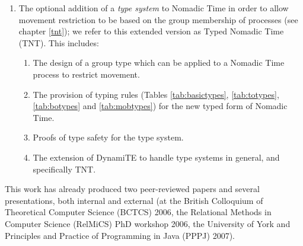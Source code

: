 \begin{enumerate}
{  framework}, DynamiTE, through the implementation of its constructs
  as programmatic elements in the Java programming language (see
  chapter \ref{dynamite}).  This allows the specification of system
  interactions to be shifted directly from the theoretical domain into
  an implementation backed by a formal methodology, with the intention
  of improving industrial adoption of concurrent techniques.  This includes:
\begin{enumerate}[\bfseries {C2.}1]
\item The creation of a translation schema (Table
  \ref{tab:translationschema1}), mapping process terms in Nomadic Time
  to Java objects.
\item The implementation of the operational semantics as methods in
  the appropriate Java objects defined in the schema.
\item The design and implementation of a plugin framework, allowing
  the use of different process calculi and different \emph{side
    effects} as the result of performing a transition.
\item The design and implementation of the \emph{evolver} framework,
  allowing the execution semantics to be both clearly denoted and
  interchangable.
\end{enumerate}
\item The optional addition of a \emph{type system} to Nomadic Time in
  order to allow movement restriction to be based on the group
  membership of processes (see chapter \ref{tnt}); we refer to this
  extended version as Typed Nomadic Time (TNT).  This includes:
\begin{enumerate}[\bfseries {C3.}1]
\item The design of a group type which can be applied to a Nomadic
  Time process to restrict movement.
\item The provision of typing rules (Tables \ref{tab:basictypes},
  \ref{tab:totypes}, \ref{tab:botypes} and \ref{tab:mobtypes}) for the
  new typed form of Nomadic Time.
\item Proofs of type safety for the type system.
\item The extension of DynamiTE to handle type systems in general, and
  specifically TNT.
\end{enumerate}
\end{enumerate}

This work has already produced two peer-reviewed papers
\cite{nt,dynamite} and several presentations, both internal and
external (at the British Colloquium of Theoretical Computer Science
(BCTCS) 2006, the Relational Methods in Computer Science (RelMiCS) PhD
workshop 2006, the University of York and Principles and Practice of
Programming in Java (PPPJ) 2007).

